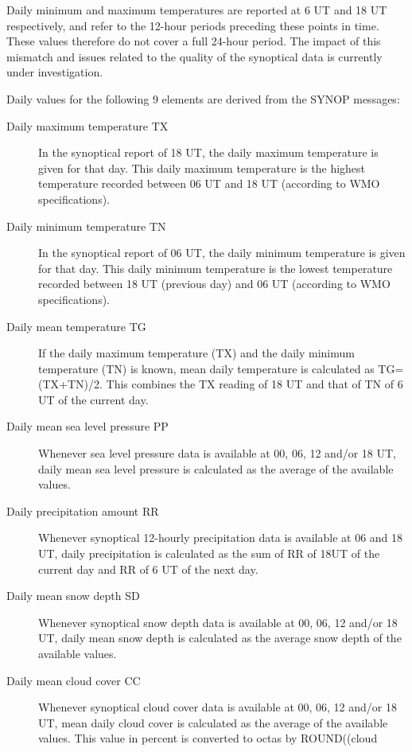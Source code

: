 \documentclass[a4paper,11pt]{article}
\begin{document}
Daily minimum and maximum temperatures are reported at 6 UT and 18 UT 
respectively, and refer to the 12-hour periods preceding these points in time. 
These values therefore do not cover a full 24-hour period. 
The impact of this mismatch and issues related to the quality of the synoptical data
is currently under investigation.

Daily values for the following 9 elements are derived from the SYNOP
messages:

\begin{description}
\item[Daily maximum temperature TX] In the synoptical report of 18
UT, the daily maximum temperature is given for that day. This daily
maximum temperature is the highest temperature recorded between 06 UT
and 18 UT (according to WMO specifications).
\item[Daily minimum temperature TN] In the synoptical report of 06 UT,
the daily minimum temperature is given for that day. This daily
minimum temperature is the lowest temperature recorded between 18 UT
(previous day) and 06 UT (according to WMO specifications).
\item[Daily mean temperature TG] If the daily maximum temperature (TX)
and the daily minimum temperature (TN) is known, mean daily
temperature is calculated as TG=(TX+TN)/2. This combines the TX reading 
of 18 UT and that of TN of 6 UT of the current day.
\item[Daily mean sea level pressure PP] Whenever sea level pressure
data is available at 00, 06, 12 and/or 18 UT, daily mean sea level
pressure is calculated as the average of the available values.
\item[Daily precipitation amount RR] Whenever synoptical 12-hourly
precipitation data is available at 06 and 18 UT, daily precipitation
is calculated as the sum of RR of 18UT of the current day and RR of 
6 UT of the next day.
\item[Daily mean snow depth SD] Whenever synoptical snow depth data is
available at 00, 06, 12 and/or 18 UT, daily mean snow depth is calculated
as the average snow depth of the available values.
\item[Daily mean cloud cover CC] Whenever synoptical cloud cover data
is available at 00, 06, 12 and/or 18 UT, mean daily cloud cover is
calculated as the average of the available values. This value in
percent is converted to octas by ROUND((cloud

\end{description}
\end{document}
